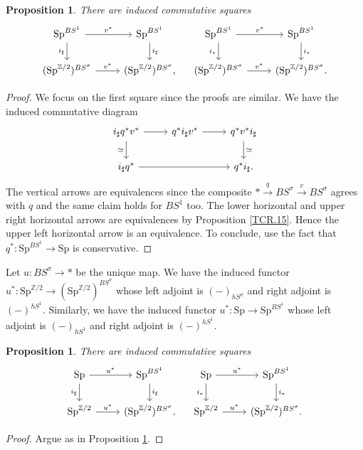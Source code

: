 \documentclass[10pt]{amsart}
\newtheorem{prop}[thm]{Proposition}
\theoremstyle{definition}
\theoremstyle{remark}
\numberwithin{equation}{section}
\newcommand{\Z}{\mathbb{Z}}
\newcommand{\Sp}{\mathrm{Sp}}
\begin{document}
\begin{prop}
\label{TCR.16}
There are induced commutative squares
\[
\begin{tikzcd}
\Sp^{BS^1}\ar[r,"v^*"]\ar[d,"i_\sharp"']&
\Sp^{BS^1}\ar[d,"i_\sharp"]
\\
(\Sp^{\Z/2})^{BS^\sigma}\ar[r,"v^*"]&
(\Sp^{\Z/2})^{BS^\sigma},
\end{tikzcd}
\quad
\begin{tikzcd}
\Sp^{BS^1}\ar[r,"v^*"]\ar[d,"i_*"']&
\Sp^{BS^1}\ar[d,"i_*"]
\\
(\Sp^{\Z/2})^{BS^\sigma}\ar[r,"v^*"]&
(\Sp^{\Z/2})^{BS^\sigma}.
\end{tikzcd}
\]
\end{prop}
\begin{proof}
We focus on the first square since the proofs are similar.
We have the induced commutative diagram
\[
\begin{tikzcd}
i_\sharp q^*v^*\ar[d,"\simeq"']\ar[r]&
q^*i_\sharp v^*\ar[r]&
q^*v^*i_\sharp
\ar[d,"\simeq"]
\\
i_\sharp q^*\ar[rr]&
&
q^*i_\sharp.
\end{tikzcd}
\]
The vertical arrows are equivalences since the composite $*\xrightarrow{q} BS^\sigma \xrightarrow{v} BS^\sigma$ agrees with $q$ and the same claim holds for $BS^1$ too.
The lower horizontal and upper right horizontal arrows are equivalences by Proposition \ref{TCR.15}.
Hence the upper left horizontal arrow is an equivalence.
To conclude,
use the fact that $q^*\colon \Sp^{BS^1}\to \Sp$ is conservative.
\end{proof}

Let $u\colon BS^\sigma \to *$ be the unique map.
We have the induced functor $u^*\colon \Sp^{\Z/2}\to (\Sp^{\Z/2})^{BS^\sigma}$ whose left adjoint is $(-)_{hS^\sigma}$ and right adjoint is $(-)^{hS^1}$.
Similarly,
we have the induced functor $u^*\colon \Sp\to \Sp^{BS^1}$ whose left adjoint is $(-)_{hS^1}$ and right adjoint is $(-)^{hS^1}$.

\begin{prop}
\label{TCR.22}
There are induced commutative squares
\[
\begin{tikzcd}
\Sp\ar[r,"u^*"]\ar[d,"i_\sharp"']&
\Sp^{BS^1}\ar[d,"i_\sharp"]
\\
\Sp^{\Z/2}\ar[r,"u^*"]&
(\Sp^{\Z/2})^{BS^\sigma},
\end{tikzcd}
\quad
\begin{tikzcd}
\Sp\ar[r,"u^*"]\ar[d,"i_*"']&
\Sp^{BS^1}\ar[d,"i_*"]
\\
\Sp^{\Z/2}\ar[r,"u^*"]&
(\Sp^{\Z/2})^{BS^\sigma}.
\end{tikzcd}
\]
\end{prop}
\begin{proof}
Argue as in Proposition \ref{TCR.16}.
\end{proof}
\end{document}
